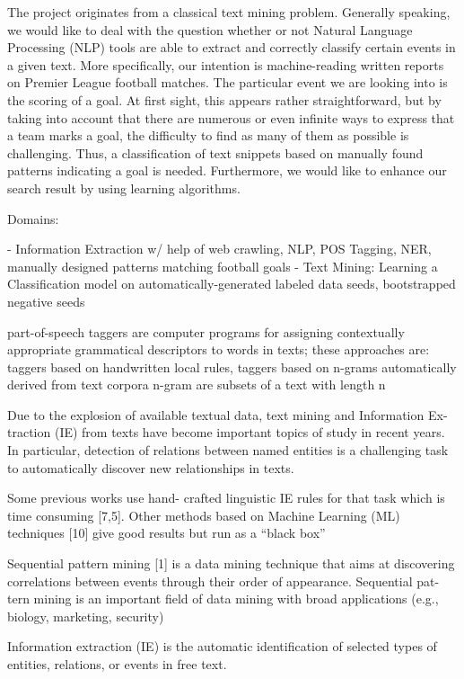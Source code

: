 \documentclass[11pt,titlepage,oneside,openany]{book}
\begin{document}
The project originates from a classical text mining problem. Generally speaking, we would like to deal with the question whether or not Natural Language Processing (NLP) tools are able to extract and correctly classify certain events in a given text. More specifically, our intention is machine-reading written reports on Premier League football matches. The particular event we are looking into is the scoring of a goal. At first sight, this appears rather straightforward, but by taking into account that there are numerous or even infinite ways to express that a team marks a goal, the difficulty to find as many of them as possible is challenging. Thus, a classification of text snippets based on manually found patterns indicating a goal is needed. Furthermore, we would like to enhance our search result by using learning algorithms.  


Domains:

- Information Extraction w/ help of web crawling, NLP, POS Tagging, NER, manually designed patterns matching football goals
- Text Mining: Learning a Classification model on automatically-generated labeled data seeds, bootstrapped negative seeds	

part-of-speech taggers are computer programs for assigning contextually appropriate grammatical descriptors to words in texts;
these approaches are: taggers based on handwritten local rules, taggers based on n-grams automatically derived from text corpora   n-gram are subsets of a text with length n \citep[p.219]{Voutilainen2005} 

Due to the explosion of available textual data, text mining and Information Ex-
traction (IE) from texts have become important topics of study in recent years.
In particular, detection of relations between named entities is a challenging task
to automatically discover new relationships in texts. \citep[p.1]{Cellier2010}

Some previous works use hand-
crafted linguistic IE rules for that task which is time consuming [7,5]. Other
methods based on Machine Learning (ML) techniques [10] give good results but
run as a “black box” \citep[p.1]{Cellier2010}

Sequential pattern mining [1] is a data mining technique that aims at discovering
correlations between events through their order of appearance. Sequential pat-
tern mining is an important ﬁeld of data mining with broad applications (e.g.,
biology, marketing, security) \citep[p.1]{Cellier2010}

Information extraction (IE) is the automatic identification of selected types of entities, relations, or events in free text. \citep[p.545]{Grishman2005}
\end{document}
